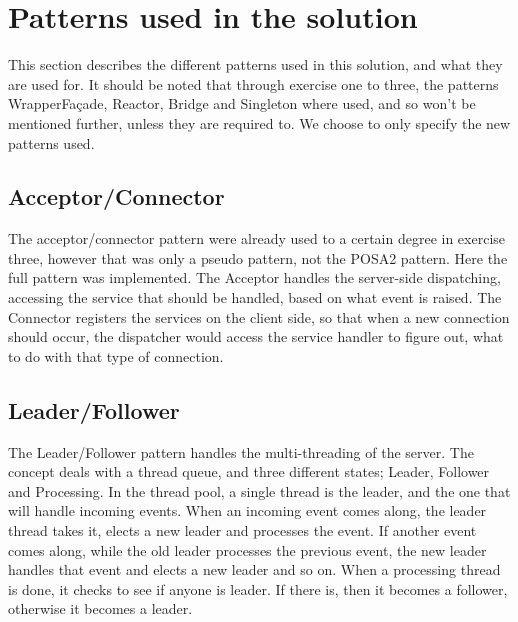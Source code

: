 \documentclass[Main]{subfiles}
\begin{document}
\section{Patterns used in the solution}\label{sec:patterns}
This section describes the different patterns used in this solution, and what they are used for. 
It should be noted that through exercise one to three, the patterns WrapperFaçade, Reactor, Bridge and Singleton where used, and so won't be mentioned further, unless they are required to. We choose to only specify the new patterns used.

\subsection{Acceptor/Connector}
The acceptor/connector pattern were already used to a certain degree in exercise three, however that was only a pseudo pattern, not the POSA2 pattern. 
Here the full pattern was implemented.
The Acceptor handles the server-side dispatching, accessing the service that should be handled, based on what event is raised.
The Connector registers the services on the client side, so that when a new connection should occur, the dispatcher would access the service handler to figure out, what to do with that type of connection.

\subsection*{Leader/Follower}
The Leader/Follower pattern handles the multi-threading of the server. The concept deals with a thread queue, and three different states; Leader, Follower and Processing. In the thread pool, a single thread is the leader, and the one that will handle incoming events. When an incoming event comes along, the leader thread takes it, elects a new leader and processes the event. If another event comes along, while the old leader processes the previous event, the new leader handles that event and elects a new leader and so on. When a processing thread is done, it checks to see if anyone is leader. If there is, then it becomes a follower, otherwise it becomes a leader.
\end{document}
